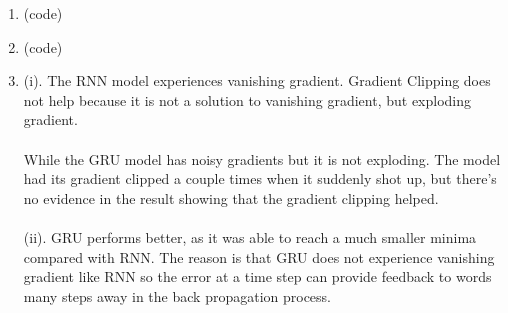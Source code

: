 \documentclass[10pt]{article}
\begin{document}
\begin{enumerate}[label=(\alph*)]
\item
(code)

\item
(code)

\item
(i). The RNN model experiences vanishing gradient. Gradient Clipping does not help because it is not a solution to vanishing gradient, but exploding gradient.\\
\\While the GRU model has noisy gradients but it is not exploding. The model had its gradient clipped a couple times when it suddenly shot up, but there's no evidence in the result showing that the gradient clipping helped.\\
\\(ii). GRU performs better, as it was able to reach a much smaller minima compared with RNN. The reason is that GRU does not experience vanishing gradient like RNN so the error at a time step can provide feedback to words many steps away in the back propagation process.


\end{enumerate}
\end{document}
